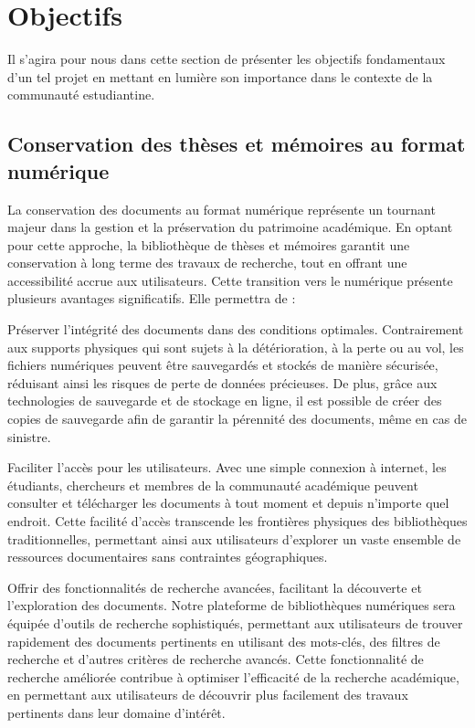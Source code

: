 \section{Objectifs}
Il s'agira pour nous dans cette section de présenter les objectifs fondamentaux d'un tel projet en mettant en lumière son importance dans le contexte de la communauté estudiantine. \par
\subsection{Conservation des thèses et mémoires au format numérique}
La conservation des documents au format numérique représente un tournant majeur dans la gestion et la préservation du patrimoine académique. En optant pour cette approche, la bibliothèque de thèses et mémoires garantit une conservation à long terme des travaux de recherche, tout en offrant une accessibilité accrue aux utilisateurs. Cette transition vers le numérique présente plusieurs avantages significatifs. Elle permettra de :\par

	Préserver l'intégrité des documents dans des conditions optimales. Contrairement aux supports physiques qui sont sujets à la détérioration, à la perte ou au vol, les fichiers numériques peuvent être sauvegardés et stockés de manière sécurisée, réduisant ainsi les risques de perte de données précieuses. De plus, grâce aux technologies de sauvegarde et de stockage en ligne, il est possible de créer des copies de sauvegarde afin de garantir la pérennité des documents, même en cas de sinistre.\par

	Faciliter l’accès pour les utilisateurs. Avec une simple connexion à internet, les étudiants, chercheurs et membres de la communauté académique peuvent consulter et télécharger les documents à tout moment et depuis n'importe quel endroit. Cette facilité d'accès transcende les frontières physiques des bibliothèques traditionnelles, permettant ainsi aux utilisateurs d'explorer un vaste ensemble de ressources documentaires sans contraintes géographiques.\par

	Offrir des fonctionnalités de recherche avancées, facilitant la découverte et l'exploration des documents. Notre plateforme de bibliothèques numériques sera équipée d'outils de recherche sophistiqués, permettant aux utilisateurs de trouver rapidement des documents pertinents en utilisant des mots-clés, des filtres de recherche et d'autres critères de recherche avancés. Cette fonctionnalité de recherche améliorée contribue à optimiser l'efficacité de la recherche académique, en permettant aux utilisateurs de découvrir plus facilement des travaux pertinents dans leur domaine d'intérêt.\par

